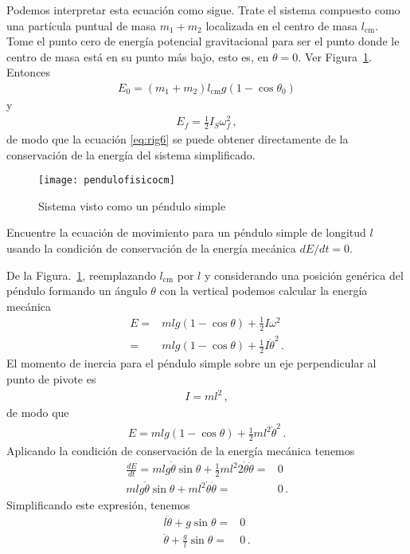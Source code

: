Podemos interpretar esta ecuación como sigue. Trate el sistema compuesto como una partícula puntual de masa $m_1+m_2$ localizada en el centro de masa $l_{\text{cm}}$. Tome el punto cero de energía potencial gravitacional para ser el punto donde le centro de masa está en su punto más bajo, esto es, en $\theta=0$. Ver Figura~\ref{fig:pendulofisicocm}. Entonces
\begin{align}
  E_0=(m_1+m_2)l_{\text{cm}} g \left(1-\cos\theta_0  \right)
\end{align}
y
\begin{align}
  E_f=\frac{1}{2}I_S \omega_f^2\,,
\end{align}
de modo que la ecuación \eqref{eq:rig6} se puede obtener directamente de la conservación de la energía del sistema simplificado.
\begin{figure}
  \centering
  \texttt{[image: pendulofisicocm]}
  \caption{Sistema visto como un péndulo simple}
  \label{fig:pendulofisicocm}
\end{figure}


\ejemplo{}
 Encuentre la ecuación de movimiento para un péndulo simple de longitud $l$  usando la condición de conservación de la energía mecánica $dE/dt=0$. 

De la Figura.~\ref{fig:pendulofisicocm}, reemplazando $l_{\text{cm}}$ por $l$ y considerando una posición genérica del péndulo formando un ángulo $\theta$ con la vertical podemos calcular la energía mecánica
\begin{align}
 E=& m l g(1-\cos\theta)+\frac{1}{2}I \omega^2\nonumber\\
 =& m l g(1-\cos\theta)+\frac{1}{2}I \dot\theta^2\,.
\end{align}
El momento de inercia para el péndulo simple sobre un eje perpendicular al punto de pivote es
\begin{align}
  I=ml^2\,,
\end{align}
de modo que
\begin{align}
  E=m l g(1-\cos\theta)+\frac{1}{2}m l^2 \dot\theta^2\,.
\end{align}
Aplicando la condición de conservación de la energía mecánica tenemos
\begin{align}
  \frac{dE}{dt}=mlg\dot\theta\sin\theta+\frac{1}{2}m l^2 2\dot\theta\ddot\theta=&0\nonumber\\
mlg\dot\theta\sin\theta+m l^2 \dot\theta\ddot\theta=&0\,.
\end{align}
Simplificando este expresión, tenemos
\begin{align}
 l\ddot\theta+ g\sin\theta=&0\nonumber\\
 \ddot\theta+ \frac{g}{l}\sin\theta=&0\,.
\end{align}

